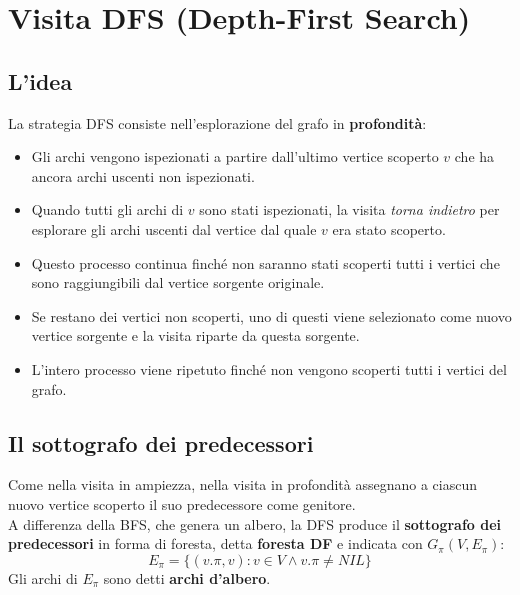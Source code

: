 \section{Visita DFS (Depth-First Search)}
\subsection{L'idea}
La strategia DFS consiste nell'esplorazione del grafo in \textbf{profondità}:
    \begin{itemize}
        \item{Gli archi vengono ispezionati a partire dall'ultimo vertice scoperto $v$ che ha ancora archi uscenti non ispezionati.}
        \item{Quando tutti gli archi di $v$ sono stati ispezionati, la visita \textit{torna indietro} per esplorare gli archi uscenti dal vertice dal quale $v$ era stato scoperto.}
        \item{Questo processo continua finché non saranno stati scoperti tutti i vertici che sono raggiungibili dal vertice sorgente originale.}
        \item{Se restano dei vertici non scoperti, uno di questi viene selezionato come nuovo vertice sorgente e la visita riparte da questa sorgente.}
        \item{L'intero processo viene ripetuto finché non vengono scoperti tutti i vertici del grafo.}
    \end{itemize}
    
\subsection{Il sottografo dei predecessori}
Come nella visita in ampiezza, nella visita in profondità assegnano a ciascun nuovo vertice scoperto il suo predecessore come genitore.\\
A differenza della BFS, che genera un albero, la DFS produce il \textbf{sottografo dei predecessori} in forma di foresta, detta \textbf{foresta DF} e indicata con $G_{\pi} (V, E_{\pi})$:
    \begin{equation}
        E_{\pi} = \{ (v.\pi, v): v \in V \wedge v.\pi \neq NIL\}
    \end{equation}
Gli archi di $E_{\pi}$ sono detti \textbf{archi d'albero}.

